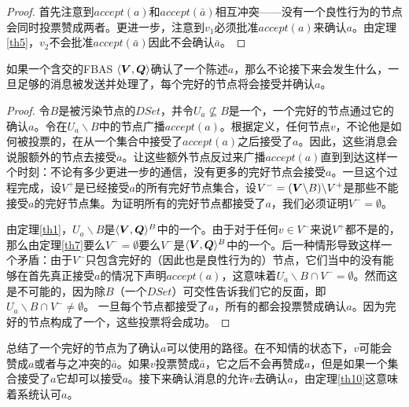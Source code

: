 \begin{proof}
	首先注意到$accept(a)$和$accept(\bar a)$相互冲突——没有一个良性行为的节点会同时投票赞成两者。更进一步，注意到$v_1$必须批准$accept(a)$来确认$a$。由定理\ref{th5}，$v_2$不会批准$accept(\bar a)$因此不会确认$\bar a$。
\end{proof}

\begin{theorem}\label{th10}
	如果一个含{\quorum}交的FBAS $\langle{\bm V},{\bm Q}\rangle$确认了一个陈述$a$，那么不论接下来会发生什么，一旦足够的消息被发送并处理了，每个完好的节点将会接受并确认$a$。
\end{theorem}

\begin{proof}
	令$B$是被污染节点的$DSet$，并令$U_a\not \subseteq B$是一个{\quorum}，一个完好的节点通过它的确认$a$。令在$U_a\backslash B$中的节点广播$accept(a)$。根据定义，任何节点$v$，不论他是如何被投票的，在从一个{\vblock}集合中接受了$accept(a)$之后接受了$a$。因此，这些消息会说服额外的节点去接受$a$。让这些额外节点反过来广播$accept(a)$直到到达这样一个时刻：不论有多少更进一步的通信，没有更多的完好节点会接受$a$。一旦这个过程完成，设$V^+$是已经接受$a$的所有完好节点集合，设$V^-=({\bm V}\backslash B)\backslash V^+$是那些不能接受$a$的完好节点集。为证明所有的完好节点都接受了$a$，我们必须证明$V^-=\emptyset$。

	由定理\ref{th1}，$U_a\backslash B$是$\langle{\bm V},{\bm Q}\rangle^{B}$中的一个{\quorum}。由于对于任何$v\in V^-$来说$V^+$都不是{\vblock}的，那么由定理\ref{th7}要么$V^-=\emptyset$要么$V^-$是$\langle{\bm V},{\bm Q}\rangle^{B}$中的一个{\quorum}。后一种情形导致这样一个矛盾：由于$V^-$只包含完好的（因此也是良性行为的）节点，它们当中的没有能够在首先真正接受$a$的情况下声明$accept(a)$，这意味着$U_a\backslash B\cap V^-=\emptyset$。然而这是不可能的，因为除$B$（一个$DSet$）{\quorum}可交性告诉我们它的反面，即$U_a\backslash B\cap V^-\neq\emptyset$。	一旦每个节点都接受了$a$，所有的都会投票赞成确认$a$。因为完好的节点构成了一个{\quorum}，这些投票将会成功。
\end{proof}

总结了一个完好的节点为了确认$a$可以使用的路径。在不知情的状态下，$v$可能会赞成$a$或者与之冲突的$\bar a$。如果$v$投票赞成$\bar a$，它之后不会再赞成$a$，但是如果一个{\vblock}集合接受了$a$它却可以接受$a$。接下来确认消息的{\quorum}允许$v$去确认$a$，由定理\ref{th10}这意味着系统认可$a$。